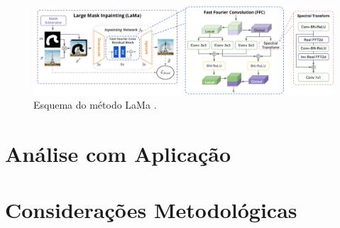 \begin{figure}[h]
    \centering
    \includegraphics[width=\textwidth]{fig/lama.png}
    \caption{Esquema do método LaMa \cite{suvorov2022resolution}.}
    \label{lama}
\end{figure}





\section{Análise com Aplicação}


\section{Considerações Metodológicas}

